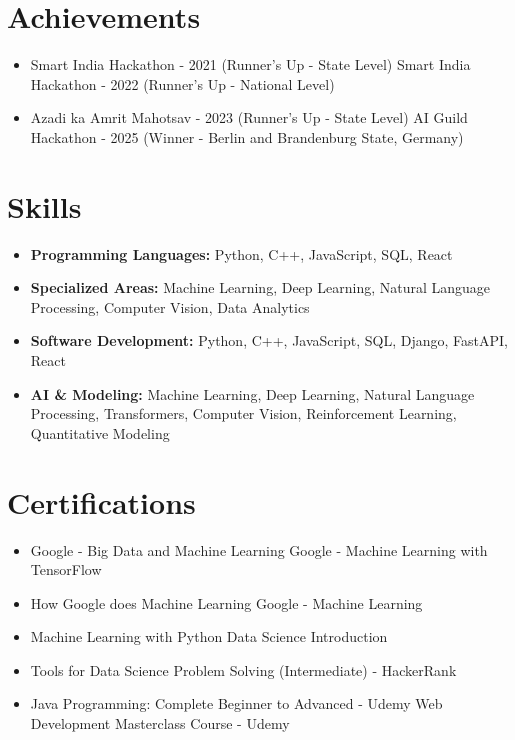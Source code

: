 \documentclass[a4paper,10pt]{article}
\begin{document}
\section*{Achievements}
\begin{itemize}
\item Smart India Hackathon - 2021 (Runner's Up - State Level) \hfill Smart India Hackathon - 2022 (Runner's Up - National Level)
\item Azadi ka Amrit Mahotsav - 2023 (Runner's Up - State Level) \hfill AI Guild Hackathon - 2025 (Winner - Berlin and Brandenburg State, Germany)
\end{itemize}

\section*{Skills}
\begin{itemize}
  \item \textbf{Programming Languages:} Python, C++, JavaScript, SQL, React
  \item \textbf{Specialized Areas:} Machine Learning, Deep Learning, Natural Language Processing, Computer Vision, Data Analytics
  \item \textbf{Software Development:} Python, C++, JavaScript, SQL, Django, FastAPI, React
  \item \textbf{AI \& Modeling:} Machine Learning, Deep Learning, Natural Language Processing, Transformers, Computer Vision, Reinforcement Learning, Quantitative Modeling
\end{itemize}

\section*{Certifications}
\begin{itemize}
\item Google - Big Data and Machine Learning \hfill Google - Machine Learning with TensorFlow
\item How Google does Machine Learning \hfill Google - Machine Learning
\item Machine Learning with Python \hfill Data Science Introduction
\item Tools for Data Science \hfill Problem Solving (Intermediate) - HackerRank
\item Java Programming: Complete Beginner to Advanced - Udemy \hfill Web Development Masterclass Course - Udemy
\end{itemize}
\end{document}
